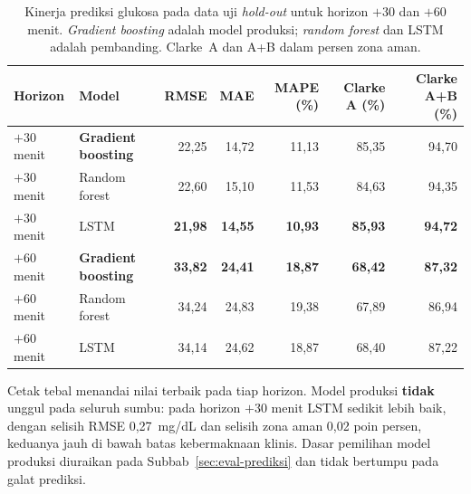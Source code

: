 \begin{table}[htbp]
\centering
\caption{Kinerja prediksi glukosa pada data uji \emph{hold-out} untuk horizon $+30$ dan $+60$ menit. \emph{Gradient boosting} adalah model produksi; \emph{random forest} dan LSTM adalah pembanding. Clarke~A dan A+B dalam persen zona aman.}
\label{tab:kinerja-prediksi}
\small
\begin{tabular}{@{}llrrrrr@{}}
\toprule
\textbf{Horizon} & \textbf{Model} & \textbf{RMSE} & \textbf{MAE} & \textbf{MAPE (\%)} & \textbf{Clarke A (\%)} & \textbf{Clarke A+B (\%)} \\
\midrule
$+30$ menit & \textbf{Gradient boosting} & 22,25 & 14,72 & 11,13 & 85,35 & 94,70 \\
$+30$ menit & Random forest & 22,60 & 15,10 & 11,53 & 84,63 & 94,35 \\
$+30$ menit & LSTM & \textbf{21,98} & \textbf{14,55} & \textbf{10,93} & \textbf{85,93} & \textbf{94,72} \\
\midrule
$+60$ menit & \textbf{Gradient boosting} & \textbf{33,82} & \textbf{24,41} & \textbf{18,87} & \textbf{68,42} & \textbf{87,32} \\
$+60$ menit & Random forest & 34,24 & 24,83 & 19,38 & 67,89 & 86,94 \\
$+60$ menit & LSTM & 34,14 & 24,62 & 18,87 & 68,40 & 87,22 \\
\bottomrule
\end{tabular}

\vspace{0.4em}
{\footnotesize Cetak tebal menandai nilai terbaik pada tiap horizon. Model produksi \textbf{tidak} unggul pada seluruh sumbu: pada horizon $+30$ menit LSTM sedikit lebih baik, dengan selisih RMSE 0,27~mg/dL dan selisih zona aman 0,02 poin persen, keduanya jauh di bawah batas kebermaknaan klinis. Dasar pemilihan model produksi diuraikan pada Subbab~\ref{sec:eval-prediksi} dan tidak bertumpu pada galat prediksi.}
\end{table}
